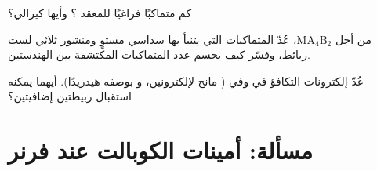 \begin{exercise}[$\star\star\star$]\label{exo:b2:coordination-complexes:10}
كم متماكبًا فراغيًا للمعقد \ce{[CoCl2(en)2]+}؟ وأيها كيرالي؟
\end{exercise}

\begin{exercise}[$\star\star\star$]\label{exo:b2:coordination-complexes:11}
من أجل $\mathrm{MA_4B_2}$، عُدّ المتماكبات التي يتنبأ بها سداسي مستوٍ ومنشور
ثلاثي لست ربائط، وفسّر كيف يحسم عدد المتماكبات المكتشفة بين
الهندستين.
\end{exercise}

\begin{exercise}[$\star\star\star$]\label{exo:b2:coordination-complexes:12}
عُدّ إلكترونات التكافؤ في  وفي 
( مانح لإلكترونين، و بوصفه هيدريدًا). أيهما يمكنه استقبال ربيطتين
إضافيتين؟
\end{exercise}

\section{مسألة: أمينات الكوبالت عند فرنر}


